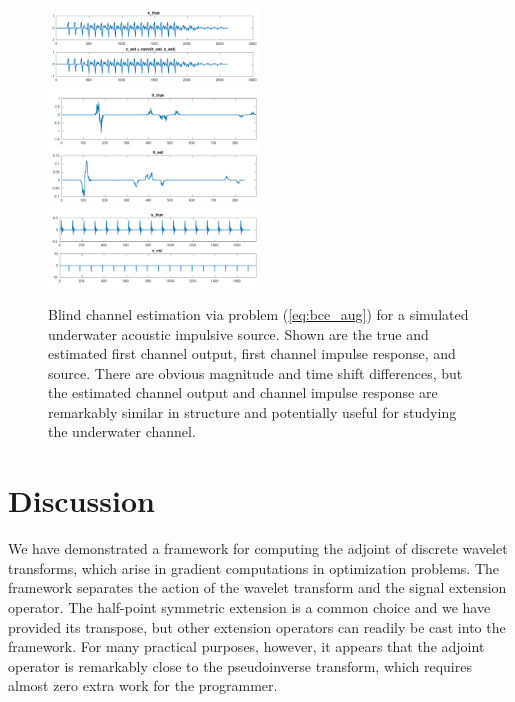 \documentclass[journal]{IEEEtran}
\begin{document}
\begin{figure}
   \centering
   \includegraphics[width=0.5\textwidth]{figures/bce_rec_004_x_trim.pdf}
   \includegraphics[width=0.5\textwidth]{figures/bce_rec_004_h_trim.pdf}
   \includegraphics[width=0.5\textwidth]{figures/bce_rec_004_s_trim.pdf}
   \caption{Blind channel estimation via problem (\ref{eq:bce_aug}) for a simulated underwater acoustic impulsive source.  Shown are the true and estimated first channel output, first channel impulse response, and source.  There are obvious magnitude and time shift differences, but the estimated channel output and channel impulse response are remarkably similar in structure and potentially useful for studying the underwater channel.}
   \label{fig:bce_rec}
\end{figure}



\section{Discussion}
We have demonstrated a framework for computing the adjoint of discrete wavelet transforms, which arise in gradient computations in optimization problems.  The framework separates the action of the wavelet transform and the signal extension operator.  The half-point symmetric extension is a common choice and we have provided its transpose, but other extension operators can readily be cast into the framework.  For many practical purposes, however, it appears that the adjoint operator is remarkably close to the pseudoinverse transform, which requires almost zero extra work for the programmer.\\
\end{document}
